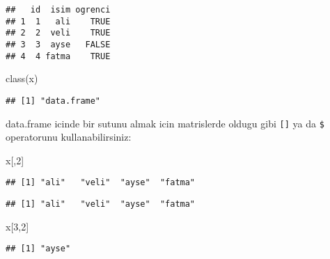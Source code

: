 \documentclass[
]{book}
\newenvironment{Shaded}{\begin{snugshade}}{\end{snugshade}}
\newcommand{\DecValTok}[1]{\textcolor[rgb]{0.00,0.00,0.81}{#1}}
\newcommand{\FunctionTok}[1]{\textcolor[rgb]{0.00,0.00,0.00}{#1}}
\newcommand{\NormalTok}[1]{#1}
\newcommand{\SpecialCharTok}[1]{\textcolor[rgb]{0.00,0.00,0.00}{#1}}
\begin{document}
\begin{verbatim}
##   id  isim ogrenci
## 1  1   ali    TRUE
## 2  2  veli    TRUE
## 3  3  ayse   FALSE
## 4  4 fatma    TRUE
\end{verbatim}

\begin{Shaded}
\begin{Highlighting}[]
\FunctionTok{class}\NormalTok{(x)}
\end{Highlighting}
\end{Shaded}

\begin{verbatim}
## [1] "data.frame"
\end{verbatim}

data.frame icinde bir sutunu almak icin matrislerde oldugu gibi \texttt{{[}{]}} ya da \texttt{\$} operatorunu kullanabilirsiniz:

\begin{Shaded}
\begin{Highlighting}[]
\NormalTok{x[,}\DecValTok{2}\NormalTok{]}
\end{Highlighting}
\end{Shaded}

\begin{verbatim}
## [1] "ali"   "veli"  "ayse"  "fatma"
\end{verbatim}

\begin{Shaded}
\end{Shaded}

\begin{verbatim}
## [1] "ali"   "veli"  "ayse"  "fatma"
\end{verbatim}

\begin{Shaded}
\begin{Highlighting}[]
\NormalTok{x[}\DecValTok{3}\NormalTok{,}\DecValTok{2}\NormalTok{]}
\end{Highlighting}
\end{Shaded}

\begin{verbatim}
## [1] "ayse"
\end{verbatim}

\begin{Shaded}
\end{Shaded}
\end{document}
